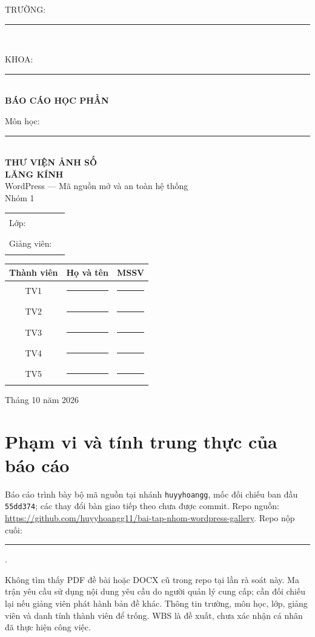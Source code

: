 \documentclass[11pt,a4paper,oneside]{report}
\newcommand{\code}[1]{\nolinkurl{#1}}
\begin{document}
\hypersetup{pageanchor=false}
\begin{titlepage}\centering
\vspace*{0.3cm}
{\large TRƯỜNG: \rule{9cm}{0.4pt}}\\[0.6cm]
{\large KHOA: \rule{9.5cm}{0.4pt}}\\[1.2cm]
{\Large\bfseries BÁO CÁO HỌC PHẦN}\\[0.7cm]
{\Large Môn học: \rule{8cm}{0.4pt}}\\[1.3cm]
{\huge\bfseries THƯ VIỆN ẢNH SỐ\\[0.25cm] LĂNG KÍNH}\\[0.7cm]
{\Large WordPress — Mã nguồn mở và an toàn hệ thống}\\[0.8cm]
{\large Nhóm 1}\\[1cm]
\begin{tabular}{ll}Lớp: & \rule{8cm}{0.4pt}\\[0.45cm]Giảng viên: & \rule{8cm}{0.4pt}\end{tabular}
\vfill
\begin{tabular}{cll}\toprule Thành viên & Họ và tên & MSSV\\\midrule
TV1 & \rule{6cm}{0.4pt} & \rule{3.5cm}{0.4pt}\\[0.35cm]
TV2 & \rule{6cm}{0.4pt} & \rule{3.5cm}{0.4pt}\\[0.35cm]
TV3 & \rule{6cm}{0.4pt} & \rule{3.5cm}{0.4pt}\\[0.35cm]
TV4 & \rule{6cm}{0.4pt} & \rule{3.5cm}{0.4pt}\\[0.35cm]
TV5 & \rule{6cm}{0.4pt} & \rule{3.5cm}{0.4pt}\\\bottomrule\end{tabular}
\vfill {\large Tháng 10 năm 2026}
\end{titlepage}
\hypersetup{pageanchor=true}
\chapter*{Phạm vi và tính trung thực của báo cáo}
Báo cáo trình bày bộ mã nguồn tại nhánh \code{huyyhoangg}, mốc đối chiếu ban đầu \code{55dd374}; các thay đổi bàn giao tiếp theo chưa được commit. Repo nguồn: \url{https://github.com/huyyhoangg11/bai-tap-nhom-wordpress-gallery}. Repo nộp cuối: \rule{7cm}{0.4pt}.

Không tìm thấy PDF đề bài hoặc DOCX cũ trong repo tại lần rà soát này. Ma trận yêu cầu sử dụng nội dung yêu cầu do người quản lý cung cấp; cần đối chiếu lại nếu giảng viên phát hành bản đề khác. Thông tin trường, môn học, lớp, giảng viên và danh tính thành viên để trống. WBS là đề xuất, chưa xác nhận cá nhân đã thực hiện công việc.
\end{document}
